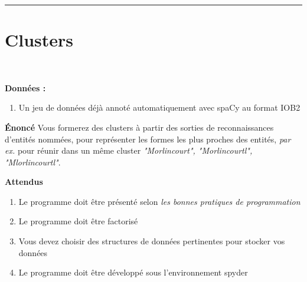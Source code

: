 \newcommand{\numTD}{TD3}
\newcommand{\themeTD}{Clustering avec un algorithme d'affinité de propagation}
\newcommand{\file}{toto.tex}



\hrule

\noindent{}
\newline
\section{Clusters}
~\\
\vspace{-1cm}


\textbf{Données :}
\begin{enumerate}
  \item Un jeu de données déjà annoté automatiquement avec spaCy au format IOB2
\end{enumerate}


\textbf{Énoncé}
Vous formerez des clusters à partir des sorties de reconnaissances d'entités nommées, pour représenter les formes les plus proches des entités, \textit{par ex.} pour réunir dans un même cluster \textit{"Morlincourt", "Morlincourtl", "Mlorlincourtl"}.


\textbf{Attendus}
\begin{enumerate}
  \item Le programme doit être présenté selon \textit{les bonnes pratiques de programmation}
  \item Le programme doit être factorisé
  \item Vous devez choisir des structures de données pertinentes pour stocker vos données
  \item Le programme doit être développé sous l'environnement spyder 
\end{enumerate}

